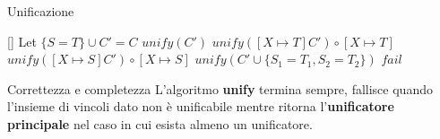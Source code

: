 \documentclass{beamer}
\begin{document}

\begin{tframe}{Unificazione}
\begin{algorithm}[H]
\scriptsize
\begin{algorithmic}[20]
\vspace{0.3cm}
	\Else
		\State Let $\{ S = T \} \cup C' = C$
			\State $unify(C')$
			\State $unify([X \mapsto T] C') \circ [X \mapsto T]$
			\State $unify([X \mapsto S] C') \circ [X \mapsto S]$
			\State $unify(C' \cup \{ S_1 = T_1, S_2 = T_2 \})$
		\Else
			\State $fail$
		\EndIf
  	\EndIf
  \EndFunction
  \vspace{0.3cm}
\end{algorithmic}
\caption{Unificazione di Robinson}
\label{alg:seq}
\end{algorithm}
\end{tframe}


\begin{tframe}{Correttezza e completezza}
L'algoritmo \textbf{unify} termina sempre, fallisce quando l'insieme di vincoli dato non è unificabile mentre ritorna l'\textbf{unificatore principale} nel caso in cui esista almeno un unificatore.

\vspace{0.3cm}

\end{tframe}

\end{document}
